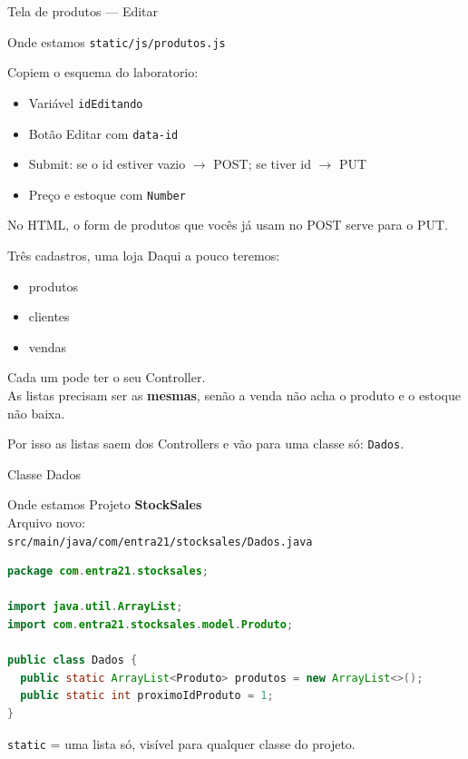 \documentclass[aspectratio=169,11pt]{beamer}
\newcommand{\onde}[1]{%
  \begin{block}{Onde estamos}
    #1
  \end{block}
}
\begin{document}
\begin{frame}{Tela de produtos --- Editar}
  \onde{\texttt{static/js/produtos.js}}

  Copiem o esquema do laboratorio:

  \vspace{0.4em}
  \begin{itemize}
    \item Variável \texttt{idEditando}
    \item Botão Editar com \texttt{data-id}
    \item Submit: se o id estiver vazio $\rightarrow$ POST;
          se tiver id $\rightarrow$ PUT
    \item Preço e estoque com \texttt{Number}
  \end{itemize}

  \vspace{0.4em}
  No HTML, o form de produtos que vocês já usam no POST
  serve para o PUT.
\end{frame}

\begin{frame}{Três cadastros, uma loja}
  Daqui a pouco teremos:

  \vspace{0.4em}
  \begin{itemize}
    \item produtos
    \item clientes
    \item vendas
  \end{itemize}

  \vspace{0.5em}
  Cada um pode ter o seu Controller.\\
  As listas precisam ser as \textbf{mesmas}, senão a venda
  não acha o produto e o estoque não baixa.

  \vspace{0.5em}
  Por isso as listas saem dos Controllers
  e vão para uma classe só: \texttt{Dados}.
\end{frame}

\begin{frame}[fragile]{Classe Dados}
  \onde{Projeto \textbf{StockSales}\\
        Arquivo novo:\\
        \texttt{src/main/java/com/entra21/stocksales/Dados.java}}

\begin{lstlisting}[language=Java,basicstyle=\ttfamily\footnotesize]
package com.entra21.stocksales;

import java.util.ArrayList;
import com.entra21.stocksales.model.Produto;

public class Dados {
  public static ArrayList<Produto> produtos = new ArrayList<>();
  public static int proximoIdProduto = 1;
}
\end{lstlisting}

  \texttt{static} = uma lista só, visível para qualquer classe
  do projeto.
\end{frame}
\end{document}

